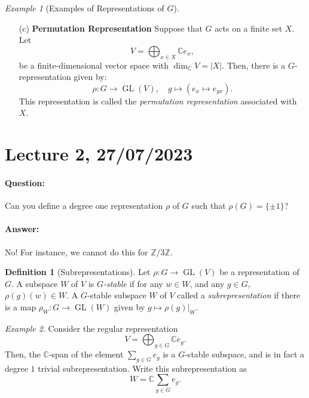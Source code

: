 \documentclass[a4paper]{report}
\theoremstyle{definition}
\newtheorem{definition}{Definition}
\theoremstyle{remark}
\theoremstyle{proposition}
\theoremstyle{conjecture}
\theoremstyle{lemma}
\theoremstyle{corollary}
\theoremstyle{exercise}
\theoremstyle{example}
\newtheorem{example}{Example}
\newcommand{\C}{\mathbb{C}}
\newcommand{\on}{\operatorname}
\begin{document}
\begin{example}[Examples of Representations of $G$]
\begin{itemize}
\begin{proof}
\begin{itemize}
                    of $G$-representations, and is in fact an isomorphism of 
                    $G$-representations since it maps basis vectors to basis
                    vectors.
            \end{itemize}
        \end{proof}
    \item[(c)] \textbf{Permutation Representation} 
        Suppose that $G$ acts on a finite set $X$. Let 
        $$V = \bigoplus_{x \in X} \C e_x,$$
        be a finite-dimensional vector space with $\dim_\C V = \vert X \vert$.
        Then, there is a $G$-representation given by:
        $$\rho : G \longrightarrow \on{GL}(V), \quad g\longmapsto (e_x \longmapsto e_{gx}).$$
        This representation is called the \emph{permutation representation}
        associated with $X$.
\end{itemize}
\end{example}

\section{Lecture 2, 27/07/2023}

\paragraph{Question:} Can you define a degree one representation $\rho$ of $G$ such that 
$\rho(G)= \lbrace \pm 1\rbrace$?
\paragraph{Answer:} No! For instance, we cannot do this for 
$\mathbb{Z}/3\mathbb{Z}$.

\begin{definition}[Subrepresentations]
    Let $\rho : G \to \on{GL}(V)$ be a representation of $G$.
    A subspace $W$ of $V$ is \emph{$G$-stable} if for any $w\in W$, 
    and any $g\in G$, $\rho(g)(w) \in W$.
    A $G$-stable subspace $W$ of $V$ called a \emph{subrepresentation}
    if there is a map $\rho_W :G \to \on{GL}(W)$ given by 
    $g\mapsto \rho(g)\vert_W$.
\end{definition}

\begin{example}
    Consider the regular representation $$V = \bigoplus_{g \in G} \C e_g.$$
    Then, the $\C$-span of the element $\sum_{g\in G}e_g$ is a $G$-stable 
    subspace, and is in fact a degree $1$ trivial subrepresentation.
    Write this subrepresentation as 
    $$W = \C \sum_{g\in G}e_g.$$
\end{example}
\end{document}
